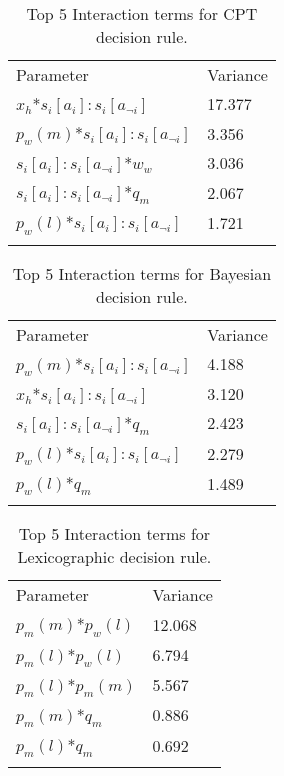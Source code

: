 \begin{table}[H]
\caption{Top 5 Interaction terms for \ac{CPT} decision rule. \label{tab:sa_interaction_prospect_sig_iqr}}
\begin{tabular} {ll}
\hline\noalign{\smallskip}
Parameter & Variance \\ 
\noalign{\smallskip}\svhline\noalign{\smallskip}

\(x_{h}\)*\(s_{i}[a_{i}]:s_{i}[a_{\neg i}]\) & 17.377\\
\(p_{w}(m)\)*\(s_{i}[a_{i}]:s_{i}[a_{\neg i}]\) & 3.356\\
\(s_{i}[a_{i}]:s_{i}[a_{\neg i}]\)*\(w_{w}\) & 3.036\\
\(s_{i}[a_{i}]:s_{i}[a_{\neg i}]\)*\(q_{m}\) & 2.067\\
\(p_{w}(l)\)*\(s_{i}[a_{i}]:s_{i}[a_{\neg i}]\) & 1.721\\
\noalign{\smallskip}\hline\noalign{\smallskip}
\end{tabular}
\end{table}

\begin{table}[H]
\caption{Top 5 Interaction terms for Bayesian decision rule. \label{tab:sa_interaction_sharing_sig_iqr}}
\begin{tabular} {ll}
\hline\noalign{\smallskip}
Parameter & Variance \\
\noalign{\smallskip}\svhline\noalign{\smallskip}
\(p_{w}(m)\)*\(s_{i}[a_{i}]:s_{i}[a_{\neg i}]\) & 4.188\\
\(x_{h}\)*\(s_{i}[a_{i}]:s_{i}[a_{\neg i}]\) & 3.120\\
\(s_{i}[a_{i}]:s_{i}[a_{\neg i}]\)*\(q_{m}\) & 2.423\\
\(p_{w}(l)\)*\(s_{i}[a_{i}]:s_{i}[a_{\neg i}]\) & 2.279\\
\(p_{w}(l)\)*\(q_{m}\) & 1.489\\
\noalign{\smallskip}\hline\noalign{\smallskip}
\end{tabular}
\end{table}

\begin{table}[H]
\caption{Top 5 Interaction terms for Lexicographic decision rule. \label{tab:sa_interaction_lexic_sig_iqr}}
\begin{tabular} {ll}
\hline\noalign{\smallskip}
Parameter & Variance \\
\noalign{\smallskip}\svhline\noalign{\smallskip}
\(p_{m}(m)\)*\(p_{w}(l)\) & 12.068\\
\(p_{m}(l)\)*\(p_{w}(l)\) & 6.794\\
\(p_{m}(l)\)*\(p_{m}(m)\) & 5.567\\
\(p_{m}(m)\)*\(q_{m}\) & 0.886\\
\(p_{m}(l)\)*\(q_{m}\) & 0.692\\
\noalign{\smallskip}\hline\noalign{\smallskip}
\end{tabular}
\end{table}

